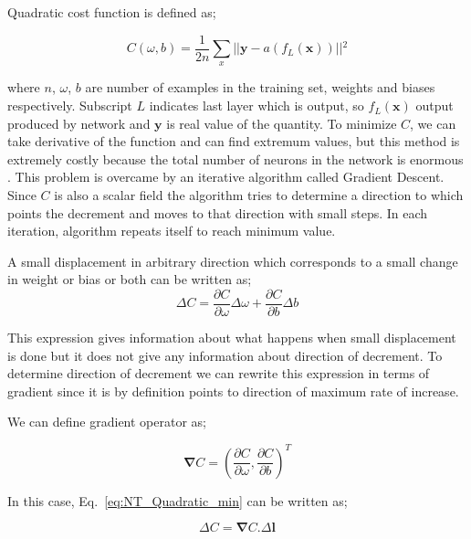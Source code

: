 \documentclass[a4paper,times,12pt]{article}
\begin{document}
Quadratic cost function is defined as;

\begin{equation}
\label{eq:NT_Quadratic}
C(\omega, b) = \frac{1}{2n} \sum\limits_{x} || \boldsymbol{y} - a(f_L(\boldsymbol{x})) ||{^2} 
\end{equation}

\noindent where $n$, $\omega$, $b$ are number of examples in the training set, weights and biases respectively. Subscript $L$ indicates last layer which is output, so $f_L(\boldsymbol{x})$ output produced by network and $\boldsymbol{y}$ is real value of the quantity. To minimize $C$, we can take derivative of the function and can find extremum values, but this method is extremely costly because the total number of neurons in the network is enormous \cite{nielsen2015neural}. This problem is overcame by an iterative algorithm called Gradient Descent. Since $C$ is also a scalar field the algorithm tries to determine a direction to which points the decrement and moves to that direction with small steps. In each iteration, algorithm repeats itself to reach minimum value. 

A small displacement in arbitrary direction which corresponds to a small change in weight or bias or both can be written as;
\begin{equation}
\label{eq:NT_Quadratic_min}
\Delta{C} = \frac{\partial{C}}{\partial{\omega}}\Delta{\omega} + \frac{\partial{C}}{\partial{b}}\Delta{b}
\end{equation}

\noindent This expression gives information about what happens when small displacement is done but it does not give any information about direction of decrement. To determine direction of decrement we can rewrite this expression in terms of gradient since it is by definition points to direction of maximum rate of increase. 

We can define gradient operator as;

\begin{equation}
\label{eq:gradient}
\boldsymbol{\nabla}{C} = \left(\frac{\partial{C}}{\partial{\omega}},\frac{\partial{C}}{\partial{b}} \right)^T
\end{equation}

\noindent In this case, Eq.~\ref{eq:NT_Quadratic_min} can be written as;

\begin{equation}
\label{eq:NT_Quadratic_min_gradient_form}
\Delta{C} = \boldsymbol{\nabla}{C} \boldsymbol{.} \Delta \boldsymbol{l}
\end{equation}
\end{document}
